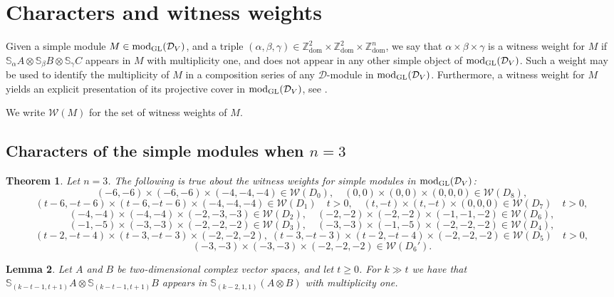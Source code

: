 \documentclass[11pt,reqno]{amsart}
\newcommand{\D}{\mathcal{D}}
\newcommand{\bS}{\mathbb{S}}
\newcommand{\tn}{\textnormal}
\newcommand{\GL}{\operatorname{GL}}
\newcommand{\dom}{\operatorname{dom}}
\newcommand{\W}{\mathcal{W}}
\newcommand{\bb}[1]{\mathbb{#1}}
\newtheorem{theorem}{Theorem}[section]
\newtheorem{lemma}[theorem]{Lemma}
\numberwithin{equation}{section}
\begin{document}
\section{Characters and witness weights}\label{sec:characters}

Given a simple module $M\in \tn{mod}_{\GL}(\D_V)$, and a triple $(\alpha,\beta,\gamma)\in \mathbb{Z}^2_{\dom}\times \bb{Z}^2_{\dom}\times \bb{Z}^n_{\dom}$, we say that $\alpha\times \beta\times \gamma$ is a witness weight for $M$ if $\bS_{\alpha}A\otimes \bS_{\beta}B\otimes \bS_{\gamma}C$ appears in $M$ with multiplicity one, and does not appear in any other simple object of $\tn{mod}_{\GL}(\D_V)$. Such a weight may be used to identify the multiplicity of $M$ in a composition series of any $\D$-module in $\tn{mod}_{\GL}(\D_V)$. Furthermore, a witness weight for $M$ yields an explicit presentation of its projective cover in $\tn{mod}_{\GL}(\D_V)$, see  \cite[Section 2.1]{lHorincz2019categories}.

We write $\W(M)$ for the set of witness weights of $M$. 


\subsection{Characters of the simple modules when $n=3$}\label{sec:charn3} 

\begin{theorem}\label{thm:witnessn3}
Let $n=3$. The following is true about the witness weights for simple modules in $\tn{mod}_{\GL}(\D_V)$:
$$
(-6,-6)\times (-6,-6)\times (-4,-4,-4)\in \W(D_0),\quad (0,0)\times (0,0)\times (0,0,0)\in \W(D_8),
$$	
$$
(t-6,-t-6)\times (t-6,-t-6)\times (-4,-4,-4)\in \W(D_1)\quad t>0,\quad (t,-t)\times (t,-t)\times (0,0,0)\in \W(D_7)\quad t>0,
$$
$$
(-4,-4)\times (-4,-4)\times (-2,-3,-3)\in \W(D_2),\quad (-2,-2)\times (-2,-2)\times (-1,-1,-2)\in \W(D_6),
$$
$$
(-1,-5)\times (-3,-3)\times (-2,-2,-2)\in \W(D_3),\quad (-3,-3)\times (-1,-5)\times (-2,-2,-2)\in \W(D_4),
$$
$$
(t-2,-t-4)\times (t-3,-t-3)\times (-2,-2,-2),\; (t-3,-t-3)\times (t-2,-t-4)\times (-2,-2,-2)\in \W(D_5)\quad t>0,
$$
$$
(-3,-3)\times (-3,-3)\times (-2,-2,-2)\in \W(D_6').
$$
\end{theorem}






\begin{lemma}\label{lem:helperLemmaWit17}
Let $A$ and $B$ be two-dimensional complex vector spaces, and let $t\geq 0$. For $k\gg  t$ we have that $\mathbb{S}_{(k-t-1,t+1)}A\otimes \mathbb{S}_{(k-t-1,t+1)}B$ appears in $\bS_{(k-2,1,1)}(A\otimes B)$ with multiplicity one.	
\end{lemma}
\end{document}
